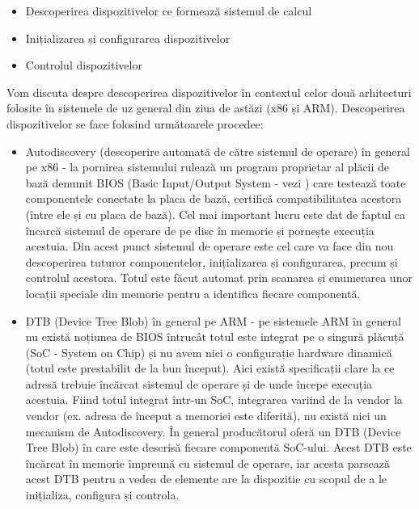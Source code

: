 \begin{itemize}
	\item Descoperirea dispozitivelor ce formează sistemul de calcul
	\item Inițializarea și configurarea dispozitivelor
	\item Controlul dispozitivelor
\end{itemize}

Vom discuta despre descoperirea dispozitivelor în contextul celor două
arhitecturi folosite în sistemele de uz general din ziua de astăzi (x86 și ARM).
Descoperirea dispozitivelor se face folosind următoarele procedee:

\begin{itemize}
	\item Autodiscovery (descoperire automată de către sistemul de operare)
		în general pe x86 - la pornirea sistemului rulează un program
		proprietar al plăcii de bază denumit BIOS  (Basic Input/Output System - vezi
		) care testează toate
		componentele conectate la placa de bază, certifică
		compatibilitatea acestora (între ele și cu placa de bază). Cel
		mai important lucru este dat de faptul ca încarcă sistemul de
		operare de pe disc în memorie și pornește execuția acestuia. Din
		acest punct sistemul de operare este cel care va face din nou
		descoperirea tuturor componentelor, inițializarea și
		configurarea, precum și controlul acestora. Totul este făcut
		automat prin scanarea și enumerarea unor locații speciale din
		memorie pentru a identifica fiecare componentă.
	\item DTB  (Device Tree Blob) în general
		pe ARM - pe sistemele ARM în general nu există noțiunea de BIOS
		întrucât totul este integrat pe o singură plăcuță (SoC - System
		on Chip) și nu avem nici o configurație hardware dinamică (totul
		este prestabilit de la bun început). Aici există specificații
		clare la ce adresă trebuie încărcat sistemul de operare și de
		unde începe execuția acestuia. Fiind totul integrat într-un SoC,
		integrarea variind de la vendor la vendor (ex. adresa de început
		a memoriei este diferită), nu există nici un mecanism de
		Autodiscovery. În general producătorul oferă un DTB (Device Tree
		Blob) în care este descrisă fiecare componentă SoC-ului. Acest
		DTB este încărcat în memorie împreună cu sistemul de operare,
		iar acesta parsează acest DTB pentru a vedea de elemente are la
		dispozitie cu scopul de a le inițializa, configura și controla.
\end{itemize}

